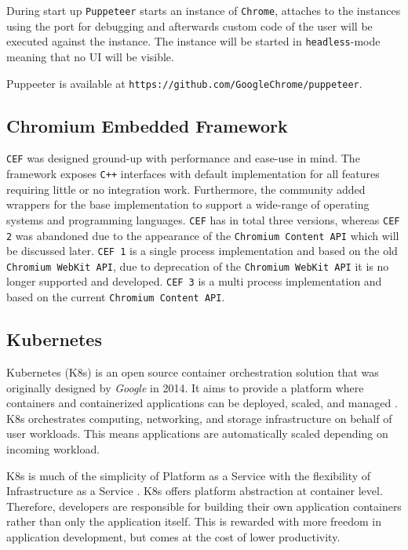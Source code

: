 During start up \texttt{Puppeteer} starts an instance of \texttt{Chrome}, attaches to the instances using the port for debugging and afterwards custom code of the user will be executed against the instance. The instance will be started in \texttt{headless}-mode meaning that no UI will be visible.

Puppeeter is available at \texttt{https://github.com/GoogleChrome/puppeteer}.

\subsection{Chromium Embedded Framework}

\texttt{CEF} was designed ground-up with performance and ease-use in mind. The framework exposes \texttt{C++} interfaces with default implementation for all features requiring little or no integration work. Furthermore, the community added wrappers for the base implementation to support a wide-range of operating systems and programming languages.
\texttt{CEF} has in total three versions, whereas \texttt{CEF 2} was abandoned due to the appearance of the \texttt{Chromium Content API} which will be discussed later. \texttt{CEF 1} is a single process implementation and based on the old \texttt{Chromium WebKit API}, due to deprecation of the \texttt{Chromium WebKit API} it is no longer supported and developed. \texttt{CEF 3} is a multi process implementation and based on the current \texttt{Chromium Content API}.

\subsection{Kubernetes}

Kubernetes (K8s) is an open source container orchestration solution that was originally designed by \textit{Google} in 2014. It aims to provide a platform where containers and containerized applications can be deployed, scaled, and managed \cite{Wikik8s}. K8s orchestrates computing, networking, and storage infrastructure on behalf of user workloads. This means applications are automatically scaled depending on incoming workload.

K8s is much of the simplicity of Platform as a Service with the flexibility of Infrastructure as a Service \cite{k8s}. K8s offers platform abstraction at container level. Therefore, developers are responsible for building their own application containers rather than only the application itself. This is rewarded with more freedom in application development, but comes at the cost of lower productivity.

